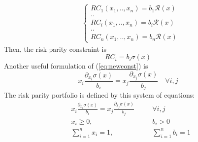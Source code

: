 \begin{equation}\label{eq:1}
\begin{aligned}
&\begin{cases}
RC_1(x_1,..,x_n) = b_1 \mathcal{R}(x)\\
..\\
RC_i(x_1,..,x_n) = b_i \mathcal{R}(x)\\
..\\
RC_n(x_1,..,x_n) = b_n \mathcal{R}(x)
\end{cases}
\end{aligned}
\end{equation} Then, the risk parity constraint is
\begin{equation}\label{eq:newconst}
RC_i = b_i \sigma (x)
\end{equation}
Another useful formulation of (\ref{eq:newconst}) is
\begin{equation}\label{eq:newconst1}
x_i \frac{\partial_{x_i} \sigma (x)}{b_i} = x_j \frac{\partial_{x_j} \sigma (x)}{b_j} \hspace{1em} \forall i,j
\end{equation}
The risk parity portfolio \cite{roncalli} is defined by this system of equations:
\begin{equation}\label{eq:rb}
\begin{aligned}
&x_i \frac{\partial_{x_i} \sigma (x)}{b_i} = x_j \frac{\partial_{x_j} \sigma (x)}{b_j} \hspace{1em} &&\forall i,j\\
&x_i \geq 0,  &&b_i > 0 \\
&\sum_{i=1}^n x_i = 1,  &&\sum_{i=1}^n b_i = 1
\end{aligned}
\end{equation}

